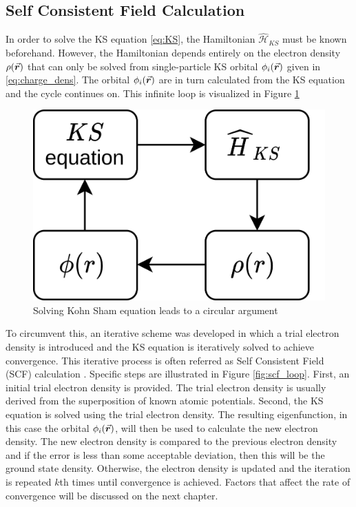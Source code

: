 \subsection{Self Consistent Field Calculation}
In order to solve the KS equation \eqref{eq:KS}, the Hamiltonian $\hat{\mathcal{H}}_{KS}$ must be known beforehand. However, the Hamiltonian depends entirely  on the electron density $\rho({\va*{r}})$ that can only be  solved from single-particle KS orbital $\phi_i(\va*{r})$ given in \eqref{eq:charge_dens}. The orbital $\phi_i(\va*{r})$ are in turn calculated from the KS equation and the cycle continues on. This infinite loop is visualized in Figure \ref{fig:KS_loop}

\begin{figure}[tbh!]
	\centering
	\includegraphics[width=0.3\linewidth]{"images/theory/KS_loop"}
	\caption[Kohn Sham loop]{Solving Kohn Sham equation leads to a circular argument}
	\label{fig:KS_loop}
\end{figure}

To circumvent this, an iterative scheme was developed  in which a trial electron density is introduced and the KS equation is iteratively solved  to achieve convergence. This iterative process is often referred as Self Consistent Field (SCF) calculation \citep{Woods2019}. Specific steps are illustrated in Figure \ref{fig:scf_loop}. First, an initial trial electron density is provided. The trial electron density is usually derived from the superposition of known atomic potentials. Second,    the KS equation is solved using the trial electron density. The resulting eigenfunction, in this case the orbital $\phi_i(\va*{r})$, will then be used to calculate the new electron density. The new electron density is compared to the previous electron density and if the error is less than some acceptable deviation, then this will be the ground state density. Otherwise, the electron density is updated and the iteration is repeated $k$th times until convergence is achieved. Factors that affect the rate of convergence will be discussed on the next chapter.

